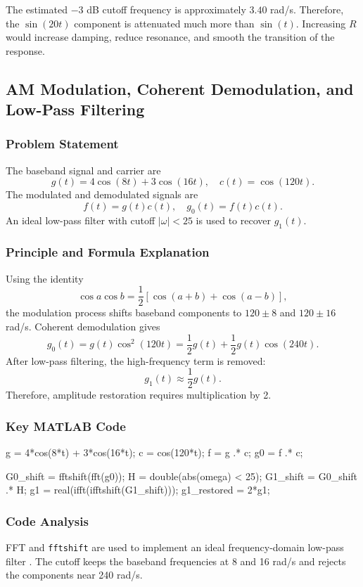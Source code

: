 \documentclass[11pt,a4paper]{article}
\begin{document}
The estimated \(-3\) dB cutoff frequency is approximately \(3.40\) rad/s. Therefore, the \(\sin(20t)\) component is attenuated much more than \(\sin(t)\). Increasing \(R\) would increase damping, reduce resonance, and smooth the transition of the response.

\subsection{AM Modulation, Coherent Demodulation, and Low-Pass Filtering}

\subsubsection{Problem Statement}
The baseband signal and carrier are
\[
g(t)=4\cos(8t)+3\cos(16t),\quad c(t)=\cos(120t).
\]
The modulated and demodulated signals are
\[
f(t)=g(t)c(t),\quad g_0(t)=f(t)c(t).
\]
An ideal low-pass filter with cutoff \(|\omega|<25\) is used to recover \(g_1(t)\).

\subsubsection{Principle and Formula Explanation}
Using the identity
\[
\cos a\cos b=\frac{1}{2}\left[\cos(a+b)+\cos(a-b)\right],
\]
the modulation process shifts baseband components to \(120\pm 8\) and \(120\pm 16\) rad/s. Coherent demodulation gives
\[
g_0(t)=g(t)\cos^2(120t)
=\frac{1}{2}g(t)+\frac{1}{2}g(t)\cos(240t).
\]
After low-pass filtering, the high-frequency term is removed:
\[
g_1(t)\approx \frac{1}{2}g(t).
\]
Therefore, amplitude restoration requires multiplication by 2.

\subsubsection{Key MATLAB Code}
\begin{matlabcode}
g = 4*cos(8*t) + 3*cos(16*t);
c = cos(120*t);
f = g .* c;
g0 = f .* c;

G0_shift = fftshift(fft(g0));
H = double(abs(omega) < 25);
G1_shift = G0_shift .* H;
g1 = real(ifft(ifftshift(G1_shift)));
g1_restored = 2*g1;
\end{matlabcode}

\subsubsection{Code Analysis}
FFT and \texttt{fftshift} are used to implement an ideal frequency-domain low-pass filter \cite{mathworksFFT}. The cutoff keeps the baseband frequencies at 8 and 16 rad/s and rejects the components near 240 rad/s.
\end{document}
